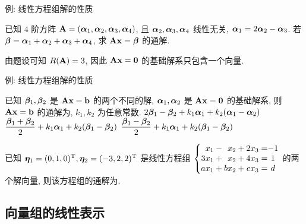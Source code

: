 \begin{frame}{例: 线性方程组解的性质}
	\onslide<+->
	\begin{example}
		已知 $4$ 阶方阵 $\bfA=(\bma_1,\bma_2,\bma_3,\bma_4)$, 且 $\bma_2,\bma_3,\bma_4$ 线性无关, $\bma_1=2\bma_2-\bma_3$.
		若 $\bmb=\bma_1+\bma_2+\bma_3+\bma_4$, 求 $\bfA\bfx=\bmb$ 的通解.
	\end{example}
	\onslide<+->
	\begin{solution}
		由题设可知 $R(\bfA)=3$, 因此 $\bfA\bfx={\bf0}$ 的基础解系只包含一个向量.
		\vspace{-\baselineskip}
	\end{solution}
\end{frame}


\begin{frame}{例: 线性方程组解的性质}
	\onslide<+->
	\begin{example}
		已知 $\bmb_1,\bmb_2$ 是 $\bfA\bfx=\bfb$ 的两个不同的解, $\bma_1,\bma_2$ 是 $\bfA\bfx={\bf0}$ 的基础解系, 则 $\bfA\bfx=\bfb$ 的通解为, $k_1,k_2$ 为任意常数.
			{$2\bmb_1-\bmb_2+k_1\bma_1+k_2(\bma_1-\bma_2)$}%
			{$\dfrac{\bmb_1+\bmb_2}2+k_1\bma_1+k_2(\bmb_1-\bmb_2)$}%
			{$\dfrac{\bmb_1-\bmb_2}2+k_1\bma_1+k_2(\bmb_1-\bmb_2)$}
	\end{example}
	\onslide<+->
	\begin{example}
		已知 $\bmet_1=(0,1,0)^\rmT,\bmet_2=(-3,2,2)^\rmT$ 是线性方程组 $\laeq[cccccccc]{
			 &x_1&{}-{}& &x_2+{}&2&x_3=&-1\\
			3&x_1&{}+{}& &x_2+{}&4&x_3=&1\\
			a&x_1&{}+{}&b&x_2+{}&c&x_3=&d
		}$ 的两个解向量, 则该方程组的通解为\fillblank[5cm]{\visible<+->{$(0,1,0)^\rmT+k(-3,1,2)^\rmT$}}.
	\end{example}
\end{frame}


\subsection{向量组的线性表示}

